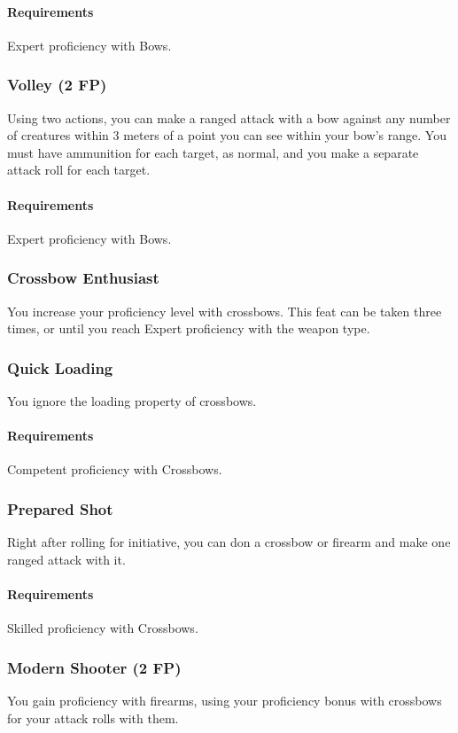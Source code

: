     \paragraph{Requirements} Expert proficiency with Bows.
\subsubsection{Volley (2 FP)} \label{feat::volley}
    Using two actions, you can make a ranged attack with a bow against any number of creatures within 3 meters of a point you can see within your bow's range.
    You must have ammunition for each target, as normal, and you make a separate attack roll for each target.
    \paragraph{Requirements} Expert proficiency with Bows.
\subsubsection{Crossbow Enthusiast} \label{feat::crossbowenthusiast}
    You increase your proficiency level with crossbows.
    This feat can be taken three times, or until you reach Expert proficiency with the weapon type.
\subsubsection{Quick Loading} \label{feat::quickloading}
    You ignore the loading property of crossbows.
    \paragraph{Requirements} Competent proficiency with Crossbows.
\subsubsection{Prepared Shot} \label{feat::preparedshot}
    Right after rolling for initiative, you can don a crossbow or firearm and make one ranged attack with it.
    \paragraph{Requirements} Skilled proficiency with Crossbows.
\subsubsection{Modern Shooter (2 FP)} \label{feat::modernshooter}
    You gain proficiency with firearms, using your proficiency bonus with crossbows for your attack rolls with them.

